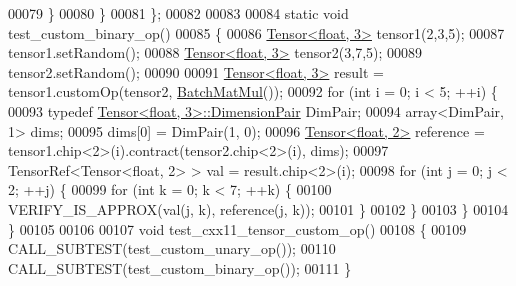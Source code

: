 \begin{DoxyCode}
00079     \}
00080   \}
00081 \};
00082 
00083 
00084 \textcolor{keyword}{static} \textcolor{keywordtype}{void} test\_custom\_binary\_op()
00085 \{
00086   \hyperlink{class_eigen_1_1_tensor}{Tensor<float, 3>} tensor1(2,3,5);
00087   tensor1.setRandom();
00088   \hyperlink{class_eigen_1_1_tensor}{Tensor<float, 3>} tensor2(3,7,5);
00089   tensor2.setRandom();
00090 
00091   \hyperlink{class_eigen_1_1_tensor}{Tensor<float, 3>} result = tensor1.customOp(tensor2, 
      \hyperlink{struct_batch_mat_mul}{BatchMatMul}());
00092   \textcolor{keywordflow}{for} (\textcolor{keywordtype}{int} i = 0; i < 5; ++i) \{
00093     \textcolor{keyword}{typedef} \hyperlink{class_eigen_1_1_tensor}{Tensor<float, 3>::DimensionPair} DimPair;
00094     array<DimPair, 1> dims;
00095     dims[0] = DimPair(1, 0);
00096     \hyperlink{class_eigen_1_1_tensor}{Tensor<float, 2>} reference = tensor1.chip<2>(i).contract(tensor2.chip<2>(i), dims);
00097     TensorRef<Tensor<float, 2> > val = result.chip<2>(i);
00098     \textcolor{keywordflow}{for} (\textcolor{keywordtype}{int} j = 0; j < 2; ++j) \{
00099       \textcolor{keywordflow}{for} (\textcolor{keywordtype}{int} k = 0; k < 7; ++k) \{
00100         VERIFY\_IS\_APPROX(val(j, k), reference(j, k));
00101       \}
00102     \}
00103   \}
00104 \}
00105 
00106 
00107 \textcolor{keywordtype}{void} test\_cxx11\_tensor\_custom\_op()
00108 \{
00109   CALL\_SUBTEST(test\_custom\_unary\_op());
00110   CALL\_SUBTEST(test\_custom\_binary\_op());
00111 \}
\end{DoxyCode}
